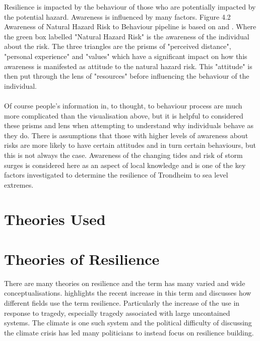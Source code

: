 Resilience is impacted by the behaviour of those who are potentially impacted by the potential hazard. Awareness is influenced by many factors. Figure 4.2 Awareness of Natural Hazard Risk to Behaviour pipeline is based on \cite{whitmarsh_are_2008} and \cite{lujala_climate_2015} . Where the green box labelled "Natural Hazard Risk" is the awareness of the individual about the risk. The three triangles are the prisms of "perceived distance", "personal experience" and "values" which have a significant impact on how this awareness is manifested as attitude to the natural hazard risk. This "attitude" is then put through the lens of "resources" before influencing the behaviour of the individual. 
\paragraph{}
Of course people's information in, to thought, to behaviour process are much more complicated than the visualisation above, but it is helpful to considered these prisms and lens when attempting to understand why individuals behave as they do. There is assumptions that those with higher levels of awareness about risks are more likely to have certain attitudes and in turn certain behaviours, but this is not always the case. \cite{lujala_climate_2015}  Awareness of the changing tides and risk of storm surges is considered here as an aspect of local knowledge and is one of the key factors investigated to determine the resilience of Trondheim to sea level extremes. 

\section{Theories Used}


\section{Theories of Resilience }

There are many theories on resilience and the term has many varied and wide conceptualisations. \cite{moser_turbulent_2019} highlights the recent increase in this term and discusses how different fields use the term resilience. Particularly the increase of the use in response to tragedy, especially tragedy associated with large uncontained systems. The climate is one such system and the political difficulty of discussing the climate crisis has led many politicians to instead focus on resilience building. 
\paragraph{}

